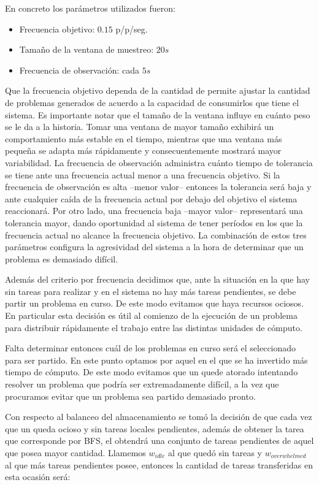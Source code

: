 En concreto los parámetros utilizados fueron:

\begin{itemize}
	\item Frecuencia objetivo: $0.15$ p/\w p/seg.
	\item Tamaño de la ventana de muestreo: $20s$
	\item Frecuencia de observación: cada $5s$
\end{itemize}

Que la frecuencia objetivo dependa de la cantidad de \ws permite ajustar la
cantidad de problemas generados de acuerdo a la capacidad de consumirlos que
tiene el sistema. Es importante notar que el tamaño de la ventana influye en
cuánto peso se le da a la historia. Tomar una ventana de mayor tamaño exhibirá un comportamiento más estable en el tiempo,
mientras que una ventana más pequeña se adapta más rápidamente y consecuentemente mostrará mayor variabilidad. La frecuencia de observación administra cuánto tiempo de
tolerancia se tiene ante una frecuencia actual menor a una frecuencia
objetivo. Si la frecuencia de observación es alta --menor valor-- entonces la
tolerancia será baja y ante cualquier caída de la frecuencia actual por debajo
del objetivo el sistema reaccionará. Por otro lado, una frecuencia baja --mayor
valor-- representará una tolerancia mayor, dando oportunidad al sistema de
tener períodos en los que la frecuencia actual no alcance la frecuencia
objetivo. La combinación de estos tres parámetros configura la agresividad
del sistema a la hora de determinar que un problema es demasiado difícil.

Además del criterio por frecuencia decidimos que, ante la situación en la que hay
\ws sin tareas para realizar y en el sistema no hay más tareas pendientes, se
debe partir un problema en curso. De este modo evitamos que haya recursos
ociosos. En particular esta decisión es útil al comienzo de la ejecución de un
problema para distribuir rápidamente el trabajo entre las distintas unidades
de cómputo.

Falta determinar entonces cuál de los problemas en curso será el seleccionado
para ser partido. En este punto optamos por aquel en el que se ha
invertido más tiempo de cómputo. De este modo evitamos que un \w quede atorado
intentando resolver un problema que podría ser extremadamente difícil, a la vez
que procuramos evitar que un problema sea partido demasiado pronto.

Con respecto al balanceo del almacenamiento se tomó la decisión de que cada
vez que un \w queda ocioso y sin tareas locales pendientes, además de obtener la
tarea que corresponde por BFS, el \w obtendrá una conjunto de tareas pendientes
de aquel \w que posea mayor cantidad. Llamemos $w_{idle}$ al \w que quedó sin
tareas y $w_{overwhelmed}$ al que más tareas pendientes posee, entonces la
cantidad de tareas transferidas en esta ocasión será:

